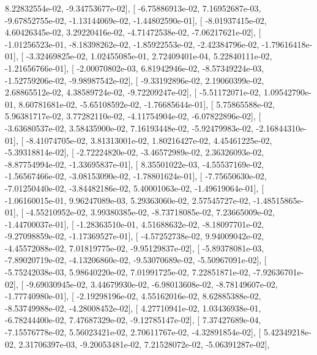 \documentclass{article}
\begin{document}
          8.22832554e-02,  -9.34753677e-02],
       [ -6.75886913e-02,   7.16952687e-03,  -9.67852755e-02,
         -1.13144069e-02,  -1.44802590e-01],
       [ -8.01937415e-02,   4.60426345e-02,   3.29220416e-02,
         -4.71472538e-02,  -7.06217621e-02],
       [ -1.01256523e-01,  -8.18398262e-02,  -1.85922553e-02,
         -2.42384796e-02,  -1.79616418e-01],
       [ -3.32469825e-02,   1.02455085e-01,   2.72409401e-04,
          5.22840111e-02,  -1.21656766e-01],
       [ -2.00070802e-03,   6.81942946e-02,  -8.57349224e-03,
         -1.52759206e-02,  -9.98987542e-02],
       [ -9.33192896e-02,   2.19060399e-02,   2.68865512e-02,
          4.38589724e-02,  -9.72209247e-02],
       [ -5.51172071e-02,   1.09542790e-01,   8.60781681e-02,
         -5.65108592e-02,  -1.76685644e-01],
       [  5.75865588e-02,   5.96381717e-02,   3.77282110e-02,
         -4.11754904e-02,  -6.07822896e-02],
       [ -3.63680537e-02,   3.58435900e-02,   7.16193448e-02,
         -5.92479983e-02,  -2.16844310e-01],
       [ -8.41074705e-02,   3.81313001e-02,   1.80216427e-02,
          4.45461225e-02,  -5.39318814e-02],
       [ -2.72224820e-02,  -3.46572989e-02,   2.36326093e-02,
         -8.87754994e-02,  -1.33695837e-01],
       [  8.35501022e-03,  -4.55537169e-02,  -1.56567466e-02,
         -3.08153090e-02,  -1.78801624e-01],
       [ -7.75650630e-02,  -7.01250440e-02,  -3.84482186e-02,
          5.40001063e-02,  -1.49619064e-01],
       [ -1.06160015e-01,   9.96247089e-03,   5.29363060e-02,
          2.57545727e-02,  -1.48515865e-01],
       [ -4.55210952e-02,   3.99380385e-02,  -8.73718085e-02,
          7.23665009e-02,  -1.44700037e-01],
       [ -1.28363510e-01,   4.51688632e-02,  -8.18097701e-02,
         -9.27098859e-02,  -1.17369527e-01],
       [ -4.57252738e-02,   9.94009042e-02,  -4.45572088e-02,
          7.01819775e-02,  -9.95129837e-02],
       [ -5.89378081e-03,  -7.89020719e-02,  -4.13206860e-02,
         -9.53070689e-02,  -5.50967091e-02],
       [ -5.75242038e-03,   5.98640220e-02,   7.01991725e-02,
          7.22851871e-02,  -7.92636701e-02],
       [ -9.69030945e-02,   3.44679930e-02,  -6.98013608e-02,
         -8.78149607e-02,  -1.77740980e-01],
       [ -2.19298196e-02,   4.55162016e-02,   8.62885388e-02,
         -8.53749988e-02,  -4.28008452e-02],
       [  4.27710941e-02,   1.03436938e-01,  -6.78244400e-02,
          7.47687329e-02,  -9.12785147e-02],
       [  7.37427689e-04,  -7.15576778e-02,   5.56023421e-02,
          2.70611767e-02,  -4.32891854e-02],
       [  5.42349218e-02,   2.31706397e-03,  -9.20053481e-02,
          7.21528072e-02,  -5.06391287e-02],
\end{document}
